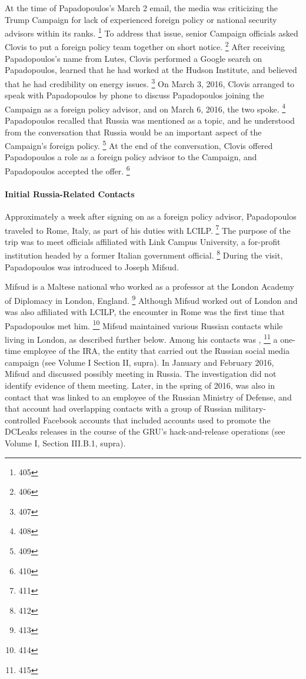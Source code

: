 At the time of Papadopoulos's March 2 email, the media was criticizing the Trump Campaign for lack of experienced foreign policy or national security advisors within its ranks.%
\footnote{405}
To address that issue, senior Campaign officials asked Clovis to put a foreign policy team together on short notice.%
\footnote{406}
After receiving Papadopoulos's name from Lutes, Clovis performed a Google search on Papadopoulos, learned that he had worked at the Hudson Institute, and believed that he had credibility on energy issues.%
\footnote{407}
On March 3, 2016, Clovis arranged to speak with Papadopoulos by phone to discuss Papadopoulos joining the Campaign as a foreign policy advisor, and on March 6, 2016, the two spoke.%
\footnote{408}
Papadopoulos recalled that Russia was mentioned as a topic, and he understood from the conversation that Russia would be an important aspect of the Campaign's foreign policy.%
\footnote{409}
At the end of the conversation, Clovis offered Papadopoulos a role as a foreign policy advisor to the Campaign, and Papadopoulos accepted the offer.%
\footnote{410}

\paragraph{Initial Russia-Related Contacts}

Approximately a week after signing on as a foreign policy advisor, Papadopoulos traveled to Rome, Italy, as part of his duties with LCILP.%
\footnote{411}
The purpose of the trip was to meet officials affiliated with Link Campus University, a for-profit institution headed by a former Italian government official.%
\footnote{412}
During the visit, Papadopoulos was introduced to Joseph Mifsud.

Mifsud is a Maltese national who worked as a professor at the London Academy of Diplomacy in London, England.%
\footnote{413}
Although Mifsud worked out of London and was also affiliated with LCILP, the encounter in Rome was the first time that Papadopoulos met him.%
\footnote{414}
Mifsud maintained various Russian contacts while living in London, as described further below.
Among his contacts was ,%
\footnote{415}
a one-time employee of the IRA, the entity that carried out the Russian social media campaign (see Volume I Section II, supra).
In January and February 2016, Mifsud and  discussed  possibly meeting in Russia.
The investigation did not identify evidence of them meeting.
Later, in the spring of 2016,  was also in contact  that was linked to an employee of the Russian Ministry of Defense, and that account had overlapping contacts with a group of Russian military-controlled Facebook accounts that included accounts used to promote the DCLeaks releases in the course of the GRU's hack-and-release operations (see Volume I, Section III.B.1, supra).

